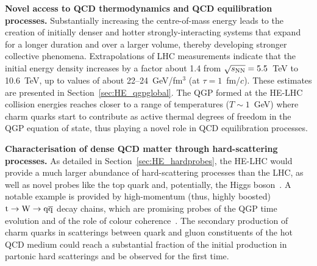 \documentclass[../report.tex]{subfiles}
\begin{document}
\noindent
	{\bf Novel access to QCD thermodynamics and QCD equilibration processes.}
	Substantially increasing the centre-of-mass energy leads to the creation of initially denser and hotter strongly-interacting systems that expand for a longer duration and over a larger volume, thereby
	developing stronger collective phenomena. 
Extrapolations of LHC measurements indicate that the initial energy density increases by a factor about 1.4 from $\sqrt{s_{\rm NN}} = 5.5$~TeV to 10.6~TeV, up to values of about 22--24~GeV/fm$^3$ (at $\tau=1$~fm/$c$).
These estimates are presented in Section~\ref{sec:HE_qgpglobal}.
The QGP formed at the HE-LHC collision energies reaches closer to a range of temperatures ($T\sim 1$~GeV) where charm quarks start to contribute as active thermal degrees of freedom in the QGP equation of state, thus playing a novel role in QCD equilibration processes. 

\noindent
	 {\bf Characterisation of dense QCD matter through hard-scattering processes.}
As detailed in Section~\ref{sec:HE_hardprobes}, the HE-LHC would provide a much larger abundance of hard-scattering processes than the LHC, as well as novel probes like the top quark and, potentially, the Higgs boson~\cite{Apolinario:2017sob,dEnterria:2015mgr,dEnterria:2017jyt}. 
A notable example is provided by high-momentum (thus, highly boosted) $\rm t \to W \to q\overline q$ decay chains, which are promising probes of the QGP time evolution and of the role of colour coherence~\cite{Apolinario:2017sob}. 
The secondary production of charm quarks in scatterings between quark and gluon constituents of the hot QCD medium could reach a substantial fraction of the initial production in partonic hard scatterings and be observed for the first time. 
\end{document}
